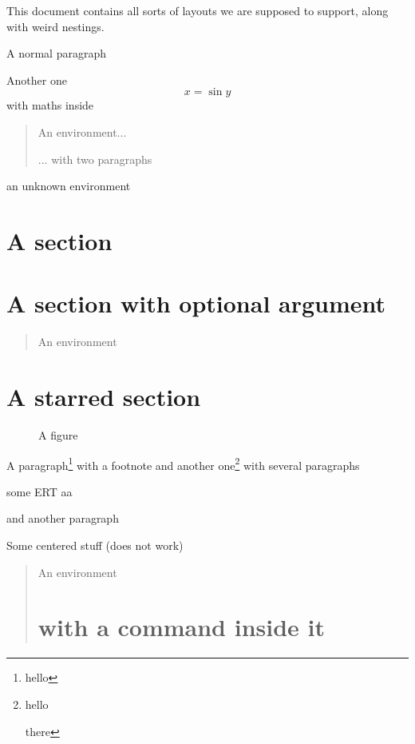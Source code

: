 \documentclass{article}
\begin{document}
This document contains all sorts of layouts we are supposed to
support, along with weird nestings.


A normal paragraph

Another one 
\begin{equation} 
x = \sin y 
\end{equation} 
with maths inside

\begin{quote}
An environment...

... with two paragraphs
\end{quote}

\begin{foo}
an unknown environment
\end{foo}


\section{A section}

\section[Hello!]{A section with optional argument}

\begin{quote}
An environment
\end{quote}

\section*{A starred section}

\begin{figure}
\caption{A figure}
\end{figure}

A paragraph\footnote{hello} with a footnote and another
one\footnote{hello 

there} with several paragraphs

some ERT \vspace{1cm} aa

and another paragraph

\begin{center}
Some centered stuff (does not work)
\end{center}

\begin{quotation}
An environment

\section*{with a command inside it}
\end{quotation}
\end{document}
